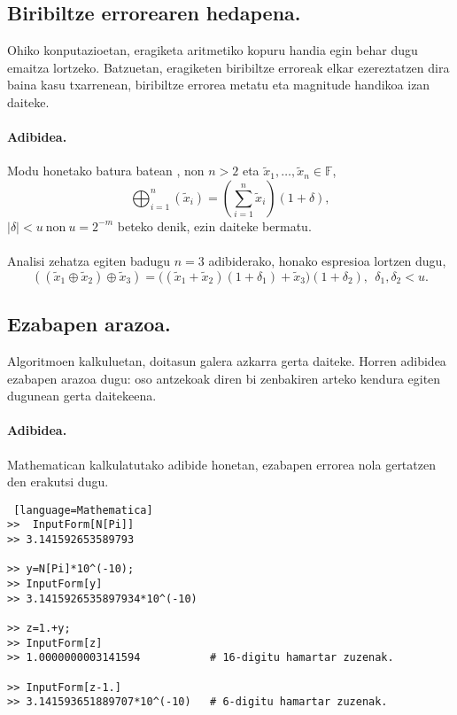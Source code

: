 \subsection*{Biribiltze errorearen hedapena.}


Ohiko konputazioetan, eragiketa aritmetiko kopuru handia egin behar dugu emaitza lortzeko. Batzuetan, eragiketen biribiltze erroreak elkar ezereztatzen dira baina kasu txarrenean, biribiltze errorea metatu eta magnitude handikoa izan daiteke.   

\paragraph*{Adibidea.} 
Modu honetako batura batean , non $n>2$ eta $\tilde x_1,\dots,\tilde x_n \in \mathbb{F}$,  
\begin{equation*}
\bigoplus_{i=1}^{n}(\tilde x_i)=(\sum\limits_{i=1}^{n} \tilde x_i)(1+\delta),
\end{equation*}
$|\delta|<u \ \text{non} \  u=2^{-m}$ beteko denik, ezin daiteke bermatu. 

\paragraph*{}Analisi zehatza egiten badugu $n=3$ adibiderako, honako espresioa lortzen dugu,
\begin{equation*}
((\tilde x_1 \oplus \tilde x_2) \oplus \tilde x_3)  = 
  \big((\tilde x_1 + \tilde x_2)(1+\delta_1)
  +\tilde x_3 \big) (1+\delta_2), \ \ \delta_1,\delta_2<u.
\end{equation*}

\subsection*{Ezabapen arazoa.}

Algoritmoen kalkuluetan, doitasun galera azkarra gerta daiteke. Horren adibidea ezabapen arazoa dugu: oso antzekoak diren bi zenbakiren arteko kendura egiten dugunean gerta daitekeena. 

\paragraph*{Adibidea.} Mathematican kalkulatutako adibide honetan, ezabapen errorea nola gertatzen den erakutsi dugu. 
\begin{lstlisting} [language=Mathematica]
>>  InputForm[N[Pi]]
>> 3.141592653589793

>> y=N[Pi]*10^(-10);
>> InputForm[y]
>> 3.1415926535897934*10^(-10)

>> z=1.+y;
>> InputForm[z]
>> 1.0000000003141594           # 16-digitu hamartar zuzenak.

>> InputForm[z-1.]
>> 3.141593651889707*10^(-10)   # 6-digitu hamartar zuzenak.

\end{lstlisting}



